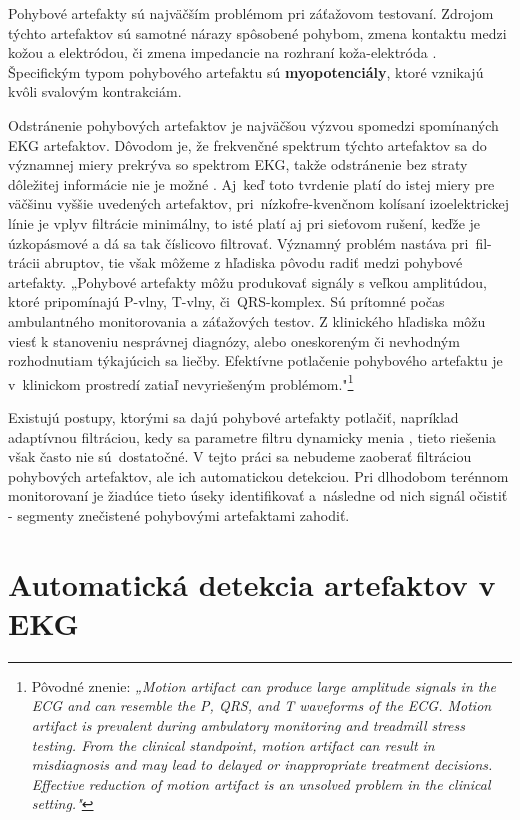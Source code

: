 Pohybové artefakty sú najväčším problémom pri záťažovom testovaní. Zdrojom týchto artefaktov sú samotné nárazy spôsobené pohybom, zmena kontaktu medzi kožou a elektródou, či zmena impedancie na rozhraní koža-elektróda \cite{Kirst2011}. Špecifickým typom pohybového artefaktu sú \textbf{myopotenciály}, ktoré vznikajú kvôli svalovým kontrakciám.

Odstránenie pohybových artefaktov je najväčšou výzvou spomedzi spomínaných EKG artefaktov. Dôvodom je, že frekvenčné spektrum týchto artefaktov sa do významnej miery prekrýva so spektrom EKG, takže odstránenie bez straty dôležitej informácie nie je možné \cite{Li2020}. Aj~keď toto tvrdenie platí do istej miery pre väčšinu vyššie uvedených artefaktov, pri~nízkofre-kvenčnom kolísaní izoelektrickej línie je vplyv filtrácie minimálny, to isté platí aj pri sieťovom rušení, keďže je úzkopásmové a dá sa tak číslicovo filtrovať. Významný problém nastáva pri~fil-trácii abruptov, tie však môžeme z hľadiska pôvodu radiť medzi pohybové artefakty. „Pohybové artefakty môžu produkovať signály s veľkou amplitúdou, ktoré pripomínajú P-vlny, T-vlny, či~QRS-komplex. Sú prítomné počas ambulantného monitorovania a záťažových testov. Z klinického hľadiska môžu viesť k stanoveniu nesprávnej diagnózy, alebo oneskoreným či nevhodným rozhodnutiam týkajúcich sa liečby. Efektívne potlačenie pohybového artefaktu je v~klinickom prostredí zatiaľ nevyriešeným problémom."\footnote{Pôvodné znenie: \textit{„Motion artifact can produce large amplitude signals in the ECG and can resemble the P, QRS, and T waveforms of the ECG. Motion artifact is prevalent during ambulatory monitoring and treadmill stress testing. From the clinical standpoint, motion artifact can result in misdiagnosis and may lead to delayed or inappropriate treatment decisions. Effective reduction of motion artifact is an unsolved problem in the clinical setting."}} \cite{Tong} 

Existujú postupy, ktorými sa dajú pohybové artefakty potlačiť, napríklad adaptívnou filtráciou, kedy sa parametre filtru dynamicky menia \cite{Kirst2011}\cite{Tong}, tieto riešenia však často nie sú~dostatočné. V tejto práci sa nebudeme zaoberať filtráciou pohybových artefaktov, ale ich automatickou detekciou. Pri dlhodobom terénnom monitorovaní je žiadúce tieto úseky identifikovať a~následne od nich signál očistiť - segmenty znečistené pohybovými artefaktami zahodiť.


\section{Automatická detekcia artefaktov v EKG}

